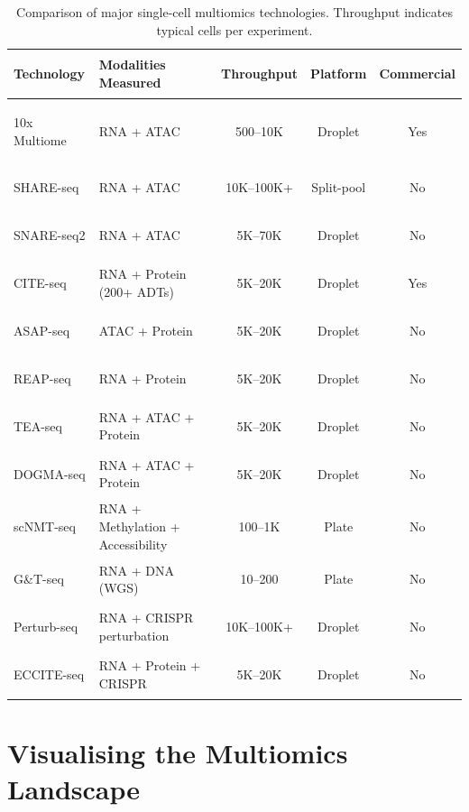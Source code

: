 \begin{table}[htbp]
\centering
\caption[Comparison of single-cell multiomics technologies.]{Comparison of major single-cell multiomics technologies. Throughput indicates typical cells per experiment.}
\label{tab:multiomics:comparison}
\small
\begin{tabularx}{\textwidth}{>{\bfseries\raggedright}p{2.5cm} X c c c}
\toprule
\textbf{Technology} & \textbf{Modalities Measured} & \textbf{Throughput} & \textbf{Platform} & \textbf{Commercial} \\
\midrule
10x Multiome & RNA + ATAC & 500--10K & Droplet & Yes \\
\addlinespace
SHARE-seq & RNA + ATAC & 10K--100K+ & Split-pool & No \\
\addlinespace
SNARE-seq2 & RNA + ATAC & 5K--70K & Droplet & No \\
\addlinespace
CITE-seq & RNA + Protein (200+ ADTs) & 5K--20K & Droplet & Yes \\
\addlinespace
ASAP-seq & ATAC + Protein & 5K--20K & Droplet & No \\
\addlinespace
REAP-seq & RNA + Protein & 5K--20K & Droplet & No \\
\addlinespace
TEA-seq & RNA + ATAC + Protein & 5K--20K & Droplet & No \\
\addlinespace
DOGMA-seq & RNA + ATAC + Protein & 5K--20K & Droplet & No \\
\addlinespace
scNMT-seq & RNA + Methylation + Accessibility & 100--1K & Plate & No \\
\addlinespace
G\&T-seq & RNA + DNA (WGS) & 10--200 & Plate & No \\
\addlinespace
Perturb-seq & RNA + CRISPR perturbation & 10K--100K+ & Droplet & No \\
\addlinespace
ECCITE-seq & RNA + Protein + CRISPR & 5K--20K & Droplet & No \\
\bottomrule
\end{tabularx}
\end{table}


\section{Visualising the Multiomics Landscape}
\label{sec:multiomics:tikz}


